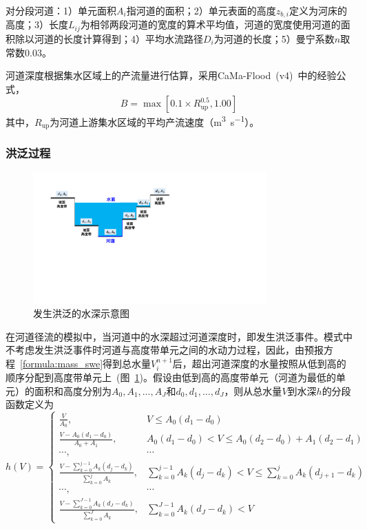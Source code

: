 对分段河道：1）单元面积$A_i$指河道的面积；2）单元表面的高度$z_{b,i}$定义为河床的高度；3）长度$L_{ij}$为相邻两段河道的宽度的算术平均值，河道的宽度使用河道的面积除以河道的长度计算得到；4）平均水流路径$D_i$为河道的长度；5）曼宁系数$n$取常数$0.03$。

河道深度根据集水区域上的产流量进行估算，采用CaMa-Flood~(v4)~\citep{yamazaki2011physically}中的经验公式，
\begin{equation}
B = \max \left[0.1\times R_{\mathrm{up}}^{0.5}, 1.00\right]
\end{equation}
其中，$R_{\mathrm{up}}$为河道上游集水区域的平均产流速度（\unit{m^3.s^{-1}}）。

\subsubsection{洪泛过程} \label{sec:lateral_flood}

{
\begin{figure}[htbp]
\centering
\includegraphics[width=0.8\textwidth]{Figures/侧向流/发生洪泛时的水深.pdf}
\caption{发生洪泛的水深示意图}
\label{fig:lateral_flood}
\end{figure}
}
在河道径流的模拟中，当河道中的水深超过河道深度时，即发生洪泛事件。模式中不考虑发生洪泛事件时河道与高度带单元之间的水动力过程，因此，由预报方程~\eqref{formula:mass_swe}得到总水量$V^{n+1}_i$后，超出河道深度的水量按照从低到高的顺序分配到高度带单元上~(图~\ref{fig:lateral_flood})。假设由低到高的高度带单元（河道为最低的单元）的面积和高度分别为$A_{0},A_{1},\ldots,A_{J}$和$d_{0},d_{1},\ldots,d_{J}$，则从总水量$V$到水深$h$的分段函数定义为
\begin{equation}
    h(V) = \begin{cases}
			\frac{V}{A_0}, & V \leqslant A_{0} \left(d_1 - d_0\right)\\
            \frac{V-A_{0} \left(d_1 - d_0\right)}{A_0+A_1}, & A_{0} \left(d_1 - d_0\right) < V \leqslant A_{0} \left(d_2 - d_0\right) + A_{1} \left(d_2 - d_1\right) \\
            \cdots, & \cdots \\
            \frac{V-\sum^{j-1}_{k=0}A_k(d_{j}-d_k)}{\sum^j_{k=0}A_k}, & \sum^{j-1}_{k=0}A_k(d_{j}-d_k) < V \leqslant \sum^{j}_{k=0}A_k(d_{j+1}-d_k)\\
            \cdots, & \cdots  \\
            \frac{V-\sum^{J-1}_{k=0}A_k(d_{J}-d_k)}{\sum^J_{k=0}A_k}, & \sum^{J-1}_{k=0}A_k(d_{J}-d_k) < V 
		 \end{cases}
\end{equation}


